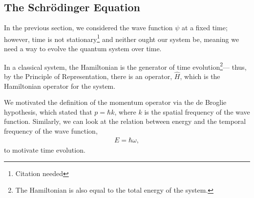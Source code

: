 \documentclass[10pt]{extarticle}
\theoremstyle{plain}
\theoremstyle{definition}
\theoremstyle{remark}
\renewcommand{\newline}{\hfill\break}
\begin{document}
  \subsection{The Schrödinger Equation}%
  In the previous section, we considered the wave function $\psi$ at a fixed time; however, time is not stationary\footnote{Citation needed} and neither ought our system be, meaning we need a way to evolve the quantum system over time.\newline

  In a classical system, the Hamiltonian is the generator of time evolution\footnote{The Hamiltonian is also equal to the total energy of the system.}--- thus, by the Principle of Representation, there is an operator, $\hat{H}$, which is the Hamiltonian operator for the system.\newline

  We motivated the definition of the momentum operator via the de Broglie hypothesis, which stated that $p = \hbar k$, where $k$ is the spatial frequency of the wave function. Similarly, we can look at the relation between energy and the temporal frequency of the wave function,
  \begin{align*}
    E = \hbar \omega,
  \end{align*}
  to motivate time evolution.\newline
\end{document}
